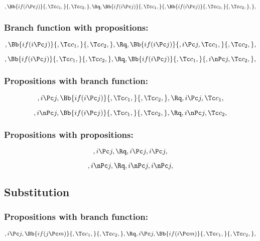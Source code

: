\bigskip
\bigskip
\bigskip
\bigskip
\[, \Bb{if(i \Pc j)}{,\Tc c_1,}{,\Tc c_2,}, \Rq , \Bb{if(i \Pc j)}{,\Tc c_1,}{,\Bb{if(i \Pc j)}{,\Tc c_3,}{,\Tc c_2,},},\]


\bigskip
\bigskip
\bigskip
\bigskip
\subsubsection{Branch function with propositions:}
\[, \Bb{if(i \Pc j)}{,\Tc c_1,}{,\Tc c_2,}, \Rq , \Bb{if(i \Pc j)}{,i \Pc j,\Tc c_1,}{,\Tc c_2,},\]

\[, \Bb{if(i \Pc j)}{,\Tc c_1,}{,\Tc c_2,}, \Rq , \Bb{if(i \Pc j)}{,\Tc c_1,}{,i \nPc j,\Tc c_2,},\]

\bigskip
\bigskip
\bigskip
\bigskip
\subsubsection{Propositions with branch function:}
\[,i \Pc j, \Bb{if(i \Pc j)}{,\Tc c_1,}{,\Tc c_2,}, \Rq , i \Pc j, \Tc c_1,\]

\[,i \nPc j, \Bb{if(i \Pc j)}{,\Tc c_1,}{,\Tc c_2,}, \Rq , i \nPc j, \Tc c_2,\]
\bigskip
\bigskip
\bigskip
\bigskip
\subsubsection{Propositions with propositions:}
\[,i \Pc j, \Rq , i \Pc j, i \Pc j,\]

\[,i \nPc j, \Rq , i \nPc j, i \nPc j,\]







\bigskip
\bigskip
\bigskip
\bigskip
\subsection{ Substitution}
\subsubsection{Propositions with branch function:}
\[,i \Pc j, \Bb{if(j \Pc m)}{,\Tc c_1,}{,\Tc c_2,}, \Rq ,i \Pc j, \Bb{if(i \Pc m)}{,\Tc c_1,}{,\Tc c_2,}, \]


